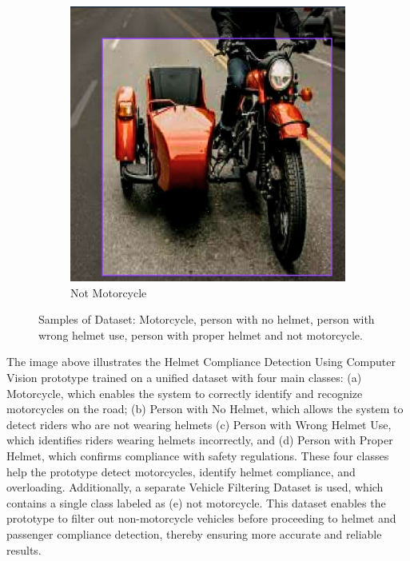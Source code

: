 \begin{refsection}
\begin{figure}[H]
\begin{subfigure}{0.30\textwidth}
        \includegraphics[width=0.9\linewidth]{figures/Fig 4e.jpg}
        \caption{Not Motorcycle}
        \label{fig:4e}
    \end{subfigure}

    \caption{Samples of Dataset: Motorcycle, person with no helmet, person with wrong helmet use, person with proper helmet and not motorcycle.}
    \label{fig:dataset_samples}
\end{figure}


The image above illustrates the Helmet Compliance Detection Using Computer Vision prototype trained on a unified dataset with four main classes: (a) Motorcycle, which enables the system to correctly identify and recognize motorcycles on the road; (b) Person with No Helmet, which allows the system to detect riders who are not wearing helmets (c) Person with Wrong Helmet Use, which identifies riders wearing helmets incorrectly, and (d) Person with Proper Helmet, which confirms compliance with safety regulations. These four classes help the prototype detect motorcycles, identify helmet compliance, and overloading.
Additionally, a separate Vehicle Filtering Dataset is used, which contains a single class labeled as (e) not motorcycle. This dataset enables the prototype to filter out non-motorcycle vehicles before proceeding to helmet and passenger compliance detection, thereby ensuring more accurate and reliable results.




\end{refsection}
